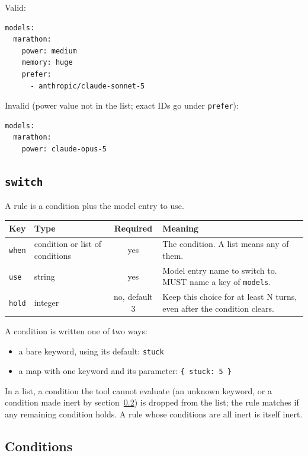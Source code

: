 \documentclass[11pt]{article}
\newcommand{\key}[1]{\texttt{#1}}
\begin{document}
Valid:

\begin{lstlisting}
models:
  marathon:
    power: medium
    memory: huge
    prefer:
      - anthropic/claude-sonnet-5
\end{lstlisting}

Invalid (power value not in the list; exact IDs go under \key{prefer}):

\begin{lstlisting}
models:
  marathon:
    power: claude-opus-5
\end{lstlisting}

\subsection{\texorpdfstring{\key{switch}}{switch}}
\label{sec:switch}

A rule is a condition plus the model entry to use.

\begin{tabularx}{\textwidth}{@{}llcX@{}}
\toprule
Key & Type & Required & Meaning \\
\midrule
\key{when} & condition or list of conditions & yes & The condition. A list means any of them. \\
\key{use} & string & yes & Model entry name to switch to. MUST name a key of \key{models}. \\
\key{hold} & integer & no, default 3 & Keep this choice for at least N turns, even after the condition clears. \\
\bottomrule
\end{tabularx}

\medskip
A condition is written one of two ways:

\begin{itemize}
  \item a bare keyword, using its default: \key{stuck}
  \item a map with one keyword and its parameter: \key{\{ stuck: 5 \}}
\end{itemize}

In a list, a condition the tool cannot evaluate (an unknown keyword, or a
condition made inert by section~\ref{sec:conditions}) is dropped from the
list; the rule matches if any remaining condition holds. A rule whose
conditions are all inert is itself inert.

\subsection{Conditions}
\label{sec:conditions}
\end{document}
